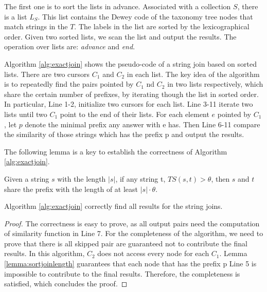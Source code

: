 The first one is to sort the lists in advance. Associated with a collection $S$, there is a list $L_S$. This list contains the Dewey code of the taxonomy tree nodes that match strings in the $T$. The labels in the list are sorted by the lexicographical order. Given two sorted lists, we scan the list and output the results. The operation over lists are: \textit{advance} and \textit{end}.



Algorithm \ref{alg:exactjoin} shows the pseudo-code of a string join based on sorted lists. There are two cursors $C_1$ and $C_2$ in each list. The key idea of the algorithm is to repeatedly find the pairs pointed by $C_1$ nd $C_2$ in two lists respectively, which share the certain number of prefixes, by iterating though the list in sorted order.  In particular, Line 1-2, initialize two cursors for each list. Line 3-11 iterate two lists until two $C_1$ point to the end of their lists. For each element $e$ pointed by $C_1$, let $p$ denote the minimal prefix any answer with e has. Then Line 6-11 compare the similarity of those strings which has the prefix p and output the results.


The following lemma is a key to establish the correctness of Algorithm \ref{alg:exactjoin}.

\begin{lem} Given a string $s$ with the length $|s|$, if any string t, $TS(s,t) > \theta$,  then $s$ and $t$ share the prefix with the length of at least $|s| \cdot \theta $.
\label{lemma:sortjoinlength}
\end{lem}

\begin{theorem} Algorithm \ref{alg:exactjoin} correctly find all results for the string joins.
\end{theorem}
\begin{proof} The correctness is easy to prove, as all output pairs need the computation of similarity function in Line 7. For the completeness of the algorithm, we need to prove that there is all skipped pair are guaranteed not to contribute the final results.  In this algorithm, $C_2$ does not access every node for each $C_1$.  Lemma \ref{lemma:sortjoinlength} guarantees that each node that has the prefix p Line 5 is impossible to contribute to the final results. Therefore, the completeness is satisfied, which concludes the proof.
\end{proof}




